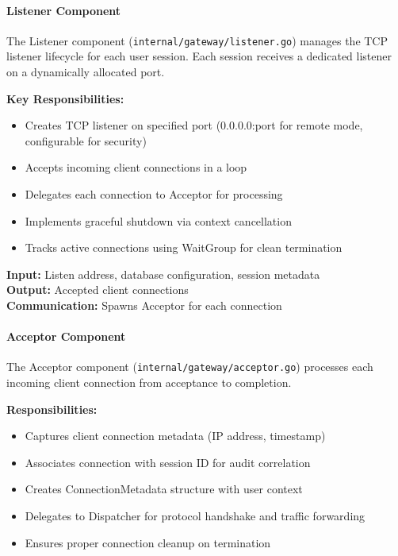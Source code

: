 \paragraph{Listener Component}

The Listener component (\texttt{internal/gateway/listener.go}) manages the TCP listener lifecycle for each user session. Each session receives a dedicated listener on a dynamically allocated port.

\textbf{Key Responsibilities:}
\begin{itemize}[leftmargin=*]
    \item Creates TCP listener on specified port (0.0.0.0:port for remote mode, configurable for security)
    \item Accepts incoming client connections in a loop
    \item Delegates each connection to Acceptor for processing
    \item Implements graceful shutdown via context cancellation
    \item Tracks active connections using WaitGroup for clean termination
\end{itemize}

\textbf{Input:} Listen address, database configuration, session metadata\\
\textbf{Output:} Accepted client connections\\
\textbf{Communication:} Spawns Acceptor for each connection

\paragraph{Acceptor Component}

The Acceptor component (\texttt{internal/gateway/acceptor.go}) processes each incoming client connection from acceptance to completion.

\textbf{Responsibilities:}
\begin{itemize}[leftmargin=*]
    \item Captures client connection metadata (IP address, timestamp)
    \item Associates connection with session ID for audit correlation
    \item Creates ConnectionMetadata structure with user context
    \item Delegates to Dispatcher for protocol handshake and traffic forwarding
    \item Ensures proper connection cleanup on termination
\end{itemize}

